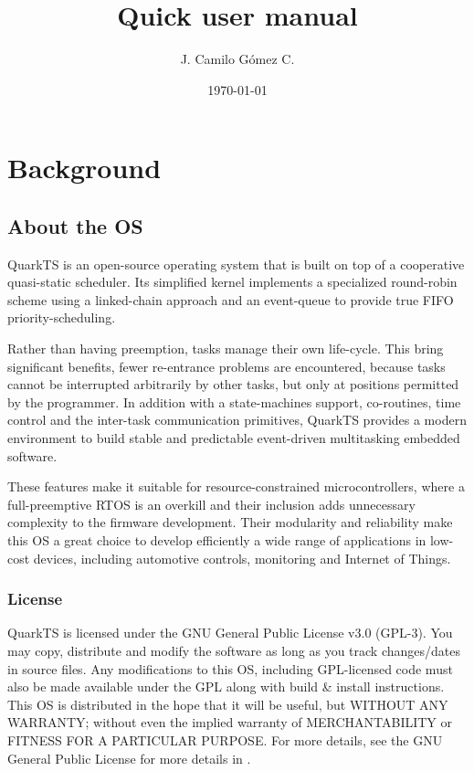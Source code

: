 \documentclass{article}
\title{
\large{Quick user manual}
}
\author{J. Camilo Gómez C.}
\date{\today}
\begin{document}
\maketitle

\tableofcontents

\clearpage
\newpage

\section{Background}
\subsection{About the OS}
QuarkTS is an open-source operating system that is built on top of a cooperative quasi-static scheduler. Its simplified kernel implements a specialized round-robin scheme using a linked-chain approach and an event-queue to provide true FIFO priority-scheduling.

Rather than having preemption,  tasks manage their own life-cycle. This bring significant benefits, fewer re-entrance problems are encountered, because tasks cannot be interrupted arbitrarily by other tasks, but only at positions permitted by the programmer. In addition with a state-machines support, co-routines, time control and the inter-task communication primitives, QuarkTS provides a modern environment to build stable and predictable event-driven multitasking embedded software.

These features make it suitable for resource-constrained microcontrollers, where a full-preemptive RTOS is an overkill and their inclusion adds unnecessary complexity to the firmware development. Their modularity and reliability make this OS a great choice to develop efficiently a wide range of applications in low-cost devices, including automotive controls, monitoring and Internet of Things.

\subsubsection{License}
QuarkTS is licensed under the GNU General Public License v3.0 (GPL-3). You may copy, distribute and modify the software as long as you track changes/dates in source files. Any modifications to this OS, including GPL-licensed code must also be made available under the GPL along with build \& install instructions. This OS is distributed in the hope that it will be useful, but WITHOUT ANY WARRANTY; without even the implied warranty of MERCHANTABILITY or FITNESS FOR A PARTICULAR PURPOSE. 
For more details, see the GNU General Public License for more details in \cite{license}. 
\end{document}
